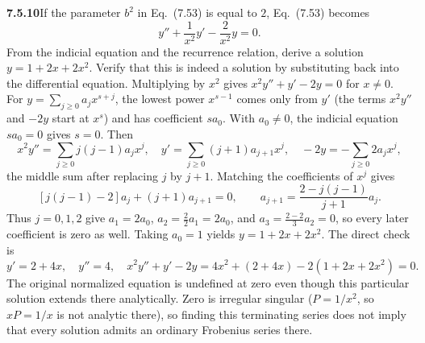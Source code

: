 \par\bigskip
\noindent\textbf{7.5.10}\quad If the parameter $b^{2}$ in Eq.~(7.53) is equal
to $2$, Eq.~(7.53) becomes
\[
y''+\frac{1}{x^{2}}y'-\frac{2}{x^{2}}y=0.
\]
From the indicial equation and the recurrence relation, derive a solution
$y=1+2x+2x^{2}$. Verify that this is indeed a solution by substituting back
into the differential equation.
\solution
Multiplying by $x^2$ gives $x^2y''+y'-2y=0$ for $x\ne0$.
For $y=\sum_{j\ge0}a_jx^{s+j}$, the lowest power $x^{s-1}$ comes only
from $y'$ (the terms $x^2y''$ and $-2y$ start at $x^s$) and has
coefficient $sa_0$. With $a_0\ne0$, the indicial equation $sa_0=0$ gives
$s=0$. Then
\[
x^2y''=\sum_{j\ge0}j(j-1)a_jx^j,\quad
y'=\sum_{j\ge0}(j+1)a_{j+1}x^j,\quad
-2y=-\sum_{j\ge0}2a_jx^j,
\]
the middle sum after replacing $j$ by $j+1$. Matching the coefficients
of $x^j$ gives
\[
[j(j-1)-2]a_j+(j+1)a_{j+1}=0,
\qquad
\boxed{a_{j+1}=\frac{2-j(j-1)}{j+1}a_j}.
\]
Thus $j=0,1,2$ give $a_1=2a_0$, $a_2=\frac22a_1=2a_0$, and
$a_3=\frac{2-2}{3}a_2=0$, so every later coefficient is zero as well.
Taking $a_0=1$ yields $\boxed{y=1+2x+2x^2}$.
The direct check is
\[
y'=2+4x,\quad y''=4,\quad
x^2y''+y'-2y=4x^2+(2+4x)-2(1+2x+2x^2)=0.
\]
The original normalized equation is undefined at zero even though this
particular solution extends there analytically. Zero is irregular
singular ($P=1/x^2$, so $xP=1/x$ is not analytic there), so finding this
terminating series does not imply that every solution admits an ordinary
Frobenius series there.

